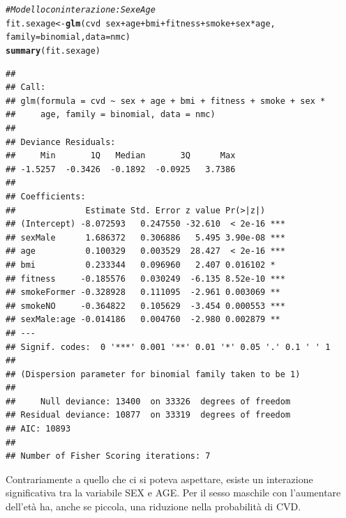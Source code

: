 \documentclass{article}\usepackage[]{graphicx}\usepackage[]{xcolor}
\makeatletter
\newcommand{\hlcom}[1]{\textcolor[rgb]{0.678,0.584,0.686}{\textit{#1}}}%
\newcommand{\hlopt}[1]{\textcolor[rgb]{0,0,0}{#1}}%
\newcommand{\hlstd}[1]{\textcolor[rgb]{0.345,0.345,0.345}{#1}}%
\newcommand{\hlkwb}[1]{\textcolor[rgb]{0.69,0.353,0.396}{#1}}%
\newcommand{\hlkwc}[1]{\textcolor[rgb]{0.333,0.667,0.333}{#1}}%
\newcommand{\hlkwd}[1]{\textcolor[rgb]{0.737,0.353,0.396}{\textbf{#1}}}%
\newenvironment{kframe}{%
 \def\at@end@of@kframe{}%
 \ifinner\ifhmode%
  \def\at@end@of@kframe{\end{minipage}}%
  \begin{minipage}{\columnwidth}%
 \fi\fi%
 \def\FrameCommand##1{\hskip\@totalleftmargin \hskip-\fboxsep
 \colorbox{shadecolor}{##1}\hskip-\fboxsep
     \hskip-\linewidth \hskip-\@totalleftmargin \hskip\columnwidth}%
 \MakeFramed {\advance\hsize-\width
   \@totalleftmargin\z@ \linewidth\hsize
   \@setminipage}}%
 {\par\unskip\endMakeFramed%
 \at@end@of@kframe}
\newenvironment{knitrout}{}{} %
\makeatother
\begin{document}
\begin{knitrout}
\color{fgcolor}\begin{kframe}
\begin{alltt}
\hlcom{#Modello con interazione: Sex e Age}
\hlstd{fit.sexage} \hlkwb{<-} \hlkwd{glm}\hlstd{(cvd}\hlopt{~}\hlstd{sex}\hlopt{+}\hlstd{age}\hlopt{+}\hlstd{bmi}\hlopt{+}\hlstd{fitness}\hlopt{+}\hlstd{smoke}\hlopt{+}\hlstd{sex}\hlopt{*}\hlstd{age,}
                  \hlkwc{family}\hlstd{=binomial,} \hlkwc{data}\hlstd{=nmc)}
\hlkwd{summary}\hlstd{(fit.sexage)}
\end{alltt}
\begin{verbatim}
## 
## Call:
## glm(formula = cvd ~ sex + age + bmi + fitness + smoke + sex * 
##     age, family = binomial, data = nmc)
## 
## Deviance Residuals: 
##     Min       1Q   Median       3Q      Max  
## -1.5257  -0.3426  -0.1892  -0.0925   3.7386  
## 
## Coefficients:
##              Estimate Std. Error z value Pr(>|z|)    
## (Intercept) -8.072593   0.247550 -32.610  < 2e-16 ***
## sexMale      1.686372   0.306886   5.495 3.90e-08 ***
## age          0.100329   0.003529  28.427  < 2e-16 ***
## bmi          0.233344   0.096960   2.407 0.016102 *  
## fitness     -0.185576   0.030249  -6.135 8.52e-10 ***
## smokeFormer -0.328928   0.111095  -2.961 0.003069 ** 
## smokeNO     -0.364822   0.105629  -3.454 0.000553 ***
## sexMale:age -0.014186   0.004760  -2.980 0.002879 ** 
## ---
## Signif. codes:  0 '***' 0.001 '**' 0.01 '*' 0.05 '.' 0.1 ' ' 1
## 
## (Dispersion parameter for binomial family taken to be 1)
## 
##     Null deviance: 13400  on 33326  degrees of freedom
## Residual deviance: 10877  on 33319  degrees of freedom
## AIC: 10893
## 
## Number of Fisher Scoring iterations: 7
\end{verbatim}
\end{kframe}
\end{knitrout}
    
    Contrariamente a quello che ci si poteva aspettare, esiste un interazione 
    significativa tra la variabile SEX e AGE. Per il sesso maschile con l'aumentare
    dell'età ha, anche se piccola, una riduzione nella probabilità di CVD.
  
  \clearpage
  
\end{document}
